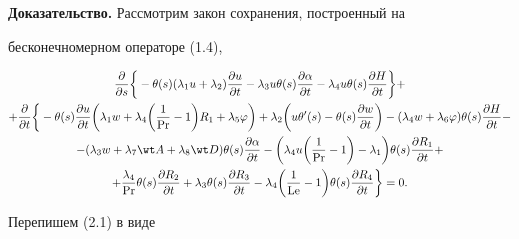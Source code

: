  


{\bf Доказательство.} Рассмотрим закон сохранения, построенный на 


бесконечномерном операторе (1.4), 


\begin{gather} 


\frac{\partial}{\partial s}\bigg\{-\theta(s)(\lambda_1u 


+\lambda_2)\frac{\partial u}{\partial t}- 


\lambda_3u\theta(s)\frac{\partial\alpha}{\partial t}- 


\lambda_4u\theta(s)\frac{\partial H}{\partial t}\bigg\}+\notag \\ 


% 


+\frac{\partial}{\partial t}\bigg\{-\theta(s) 


\frac{\partial u}{\partial t}\bigg(\lambda_1w+\lambda_4\bigg( 


\frac{1}{\PR}-1\bigg)R_1+\lambda_5\varphi\bigg)+\lambda_2 


\bigg(u\theta'(s)-\theta(s)\frac{\partial w}{\partial t}\bigg)- 


(\lambda_4w+\lambda_6\varphi)\theta(s) 


\frac{\partial H}{\partial t} -\notag \\ 


% 


-(\lambda_3w+\lambda_7\wt A+\lambda_8\wt D)\theta(s) 


\frac{\partial\alpha}{\partial t}-\bigg(\lambda_4u 


\bigg(\frac{1}{\PR}-1\bigg)-\lambda_1\bigg) 


\theta(s)\frac{\partial R_1}{\partial t}+\notag \\ 


% 


+\frac{\lambda_4}{\PR}\theta(s) 


\frac{\partial R_2}{\partial t}+\lambda_3\theta(s) 


\frac{\partial R_3}{\partial t}-\lambda_4\bigg( 


\frac{1}{\Le}-1\bigg)\theta(s) 


\frac{\partial R_4}{\partial t}\bigg\}=0. 


\end{gather} 


Перепишем (2.1) в виде 


